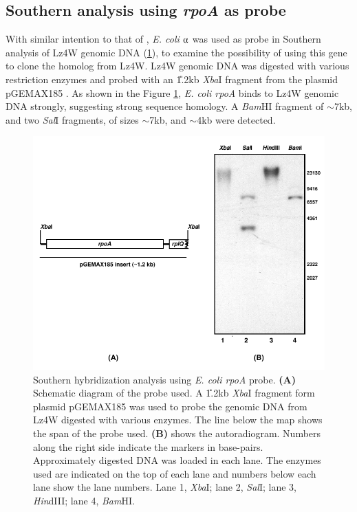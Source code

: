 \subsection{Southern analysis using  \emph{rpoA} as probe}

With similar intention to that of , \emph{E. coli}
$\alphaup$ was used as probe in Southern analysis of Lz4W genomic
DNA (\ref{chap3_fig:alpha_southern}), to examine the possibility
of using this gene to clone the homolog from Lz4W. Lz4W genomic
DNA was digested with various restriction enzymes and probed with
an \U{1.2}{kb} \emph{Xba}I fragment from the plasmid pGEMAX185
\citep{Igarashi1991}. As shown in the Figure
\ref{chap3_fig:alpha_southern}, \emph{E. coli rpoA} binds to Lz4W
genomic DNA strongly, suggesting strong sequence homology. A
\emph{Bam}HI fragment of \U{$\sim$7}{kb}, and two \emph{Sal}I
fragments, of sizes \U{$\sim$7}{kb}, and \U{$\sim$4}{kb} were
detected.

\begin{figure}[tbp]

\centering

\includegraphics{figures/chap3_alpha_southern}

\caption[Southern analysis using \emph{E.coli rpoA}
probe]{Southern hybridization analysis using \emph{E. coli rpoA}
probe. \textbf{(A)} Schematic diagram of the probe used. A
\U{1.2}{kb} \emph{Xba}I fragment form plasmid pGEMAX185
\citep{Igarashi1991} was used to probe the genomic DNA from Lz4W
digested with various enzymes. The line below the map shows the
span of the probe used. \textbf{(B)} shows the autoradiogram.
Numbers along the right side indicate the markers in base-pairs.
Approximately  digested DNA was loaded in each lane. The
enzymes used are indicated on the top of each lane and numbers
below each lane show the lane numbers. Lane 1, \emph{Xba}I; lane
2, \emph{Sal}I; lane 3, \emph{Hin}dIII; lane 4, \emph{Bam}HI.}

\label{chap3_fig:alpha_southern}

\end{figure}


